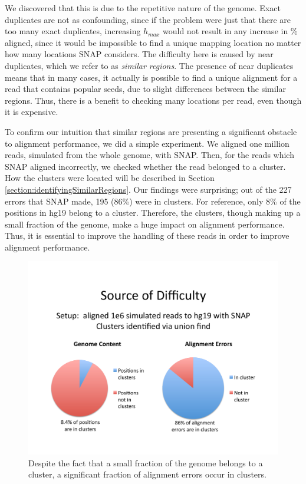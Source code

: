 \documentclass[twocolumn,10pt]{article}
\begin{document}
We discovered that this is due to the repetitive nature of the genome.  Exact duplicates are not as confounding, since if the problem were just that there are too many exact duplicates, increasing \(h_{max}\) would not result in any increase in \% aligned, since it would be impossible to find a unique mapping location no matter how many locations SNAP considers.  The difficulty here is caused by near duplicates, which we refer to as \textit{similar regions}.  The presence of near duplicates means that in many cases, it actually is possible to find a unique alignment for a read that contains popular seeds, due to slight differences between the similar regions.  Thus, there is a benefit to checking many locations per read, even though it is expensive.

To confirm our intuition that similar regions are presenting a significant obstacle to alignment performance, we did a simple experiment.  We aligned one million reads, simulated from the whole genome, with SNAP.  Then, for the reads which SNAP aligned incorrectly, we checked whether the read belonged to a cluster.  How the clusters were located will be described in Section \ref{section:identifyingSimilarRegions}.  Our findings were surprising; out of the 227 errors that SNAP made, 195 (86\%) were in clusters.  For reference, only 8\% of the positions in hg19 belong to a cluster.  Therefore, the clusters, though making up a small fraction of the genome, make a huge impact on alignment performance.  Thus, it is essential to improve the handling of these reads in order to improve alignment performance.

\begin{figure}
\centering
\includegraphics[scale=0.6]{errorsInClusters.pdf}
\caption{Despite the fact that a small fraction of the genome belongs to a cluster, a significant fraction of alignment errors occur in clusters.}
\label{fig:errorsInClusters}
\end{figure}
\end{document}
